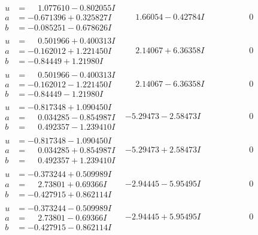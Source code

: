 \documentclass[1p]{elsarticle_modified}
\theoremstyle{definition}
\begin{document}
$$\begin{array}{c|c|c}
\begin{aligned}
u &= \phantom{-}1.077610 - 0.802055 I \\
a &= -0.671396 + 0.325827 I \\
b &= -0.085251 - 0.678626 I\end{aligned}
 & \phantom{-}1.66054 - 0.42784 I & \phantom{-0.000000 } 0 \\ \hline\begin{aligned}
u &= \phantom{-}0.501966 + 0.400313 I \\
a &= -0.162012 + 1.221450 I \\
b &= -0.84449 + 1.21980 I\end{aligned}
 & \phantom{-}2.14067 + 6.36358 I & \phantom{-0.000000 } 0 \\ \hline\begin{aligned}
u &= \phantom{-}0.501966 - 0.400313 I \\
a &= -0.162012 - 1.221450 I \\
b &= -0.84449 - 1.21980 I\end{aligned}
 & \phantom{-}2.14067 - 6.36358 I & \phantom{-0.000000 } 0 \\ \hline\begin{aligned}
u &= -0.817348 + 1.090450 I \\
a &= \phantom{-}0.034285 - 0.854987 I \\
b &= \phantom{-}0.492357 - 1.239410 I\end{aligned}
 & -5.29473 - 2.58473 I & \phantom{-0.000000 } 0 \\ \hline\begin{aligned}
u &= -0.817348 - 1.090450 I \\
a &= \phantom{-}0.034285 + 0.854987 I \\
b &= \phantom{-}0.492357 + 1.239410 I\end{aligned}
 & -5.29473 + 2.58473 I & \phantom{-0.000000 } 0 \\ \hline\begin{aligned}
u &= -0.373244 + 0.509989 I \\
a &= \phantom{-}2.73801 + 0.69366 I \\
b &= -0.427915 + 0.862114 I\end{aligned}
 & -2.94445 - 5.95495 I & \phantom{-0.000000 } 0 \\ \hline\begin{aligned}
u &= -0.373244 - 0.509989 I \\
a &= \phantom{-}2.73801 - 0.69366 I \\
b &= -0.427915 - 0.862114 I\end{aligned}
 & -2.94445 + 5.95495 I & \phantom{-0.000000 } 0\\

\end{array}$$
\end{document}
